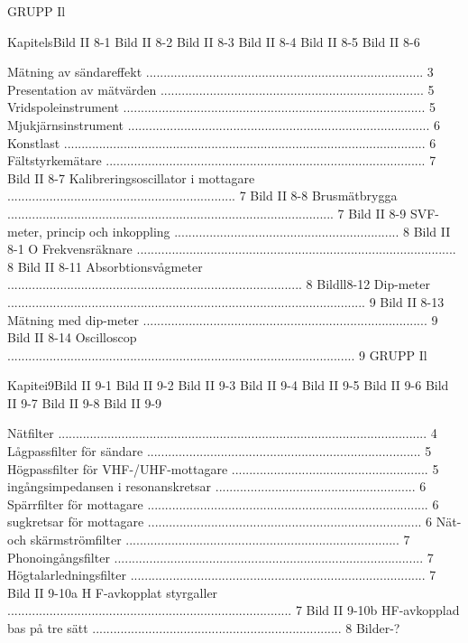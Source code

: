 GRUPP Il

KapitelsBild II 8-1
Bild II 8-2
Bild II 8-3
Bild II 8-4
Bild II 8-5
Bild II 8-6

Mätning av sändareffekt ............................................................................... 3
Presentation av mätvärden ........................................................................... 5
Vridspoleinstrument ...................................................................................... 5
Mjukjärnsinstrument ...................................................................................... 6
Konstlast ....................................................................................................... 6
Fältstyrkemätare ........................................................................................... 7
Bild II 8-7
Kalibreringsoscillator i mottagare ................................................................. 7
Bild II 8-8
Brusmätbrygga ............................................................................................. 7
Bild II 8-9
SVF-meter, princip och inkoppling ................................................................ 8
Bild II 8-1 O Frekvensräknare ........................................................................................... 8
Bild II 8-11
Absorbtionsvågmeter .................................................................................... 8
Bildll8-12 Dip-meter ...................................................................................................... 9
Bild II 8-13 Mätning med dip-meter ................................................................................. 9
Bild II 8-14 Oscilloscop ................................................................................................... 9
GRUPP Il

Kapitei9Bild II 9-1
Bild II 9-2
Bild II 9-3
Bild II 9-4
Bild II 9-5
Bild II 9-6
Bild II 9-7
Bild II 9-8
Bild II 9-9

Nätfilter ......................................................................................................... 4
Lågpassfilter för sändare .............................................................................. 5
Högpassfilter för VHF-/UHF-mottagare ........................................................ 5
ingångsimpedansen i resonanskretsar ......................................................... 6
Spärrfilter för mottagare ................................................................................ 6
sugkretsar för mottagare .............................................................................. 6
Nät- och skärmströmfilter .............................................................................. 7
Phonoingångsfilter ........................................................................................ 7
Högtalarledningsfilter .................................................................................... 7
Bild II 9-10a H F-avkopplat styrgaller ................................................................................. 7
Bild II 9-10b HF-avkopplad bas på tre sätt ....................................................................... 8
Bilder-?

